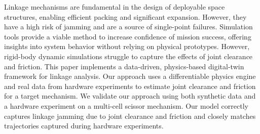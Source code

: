 Linkage mechanisms are fundamental in the design of deployable space structures, enabling efficient packing and significant expansion. However, they have a high risk of jamming and are a source of single-point failures. 
Simulation tools provide a viable method to increase confidence of mission success, offering insights into system behavior without relying on physical prototypes. However, rigid-body dynamic simulations struggle to capture the effects of joint clearance and friction. 
This paper implements a data-driven, physics-based digital-twin framework for linkage analysis. Our approach uses a differentiable physics engine and real data from hardware experiments to estimate joint clearance and friction for a target mechanism.
We validate our approach using both synthetic data and a hardware experiment on a multi-cell scissor mechanism. Our model correctly captures linkage jamming due to joint clearance and friction and closely matches trajectories captured during hardware experiments. 

